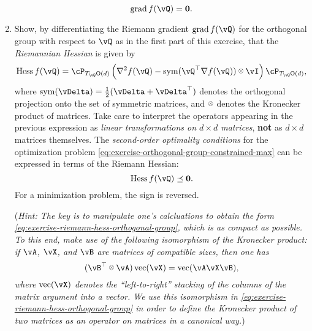 \documentclass[\toplevelprefix/book-main.tex]{subfiles}
\begin{document}
\begin{exercise}
\begin{enumerate}
        \begin{equation*}
            \mathrm{grad}\, f(\vQ) = \mathbf{0}.
        \end{equation*}
        \item Show, by differentiating the Riemann gradient $\mathrm{grad}\, f(\vQ)$ for the orthogonal group with respect to $\vQ$ as in the first part of this exercise, that the \textit{Riemannian Hessian} is given by
        \begin{equation}\label{eq:exercise-riemann-hess-orthogonal-group}
            \mathrm{Hess}\, f(\vQ) = \cP_{T_{\vQ}\O(d)} \left( 
            \nabla^2 f(\vQ) - \Symm(\vQ^\top \nabla f(\vQ)) \kron \vI
            \right) \cP_{T_{\vQ}\O(d)},
        \end{equation}
        where $\Symm(\vDelta) = \tfrac{1}{2}(\vDelta + \vDelta^\top)$ denotes the orthogonal projection onto the set of symmetric matrices, and $\kron$ denotes the Kronecker product of matrices.
        Take care to interpret the operators appearing in the previous expression as \textit{linear transformations on ${d \times d}$ matrices}, \textbf{not} as $d \times d$ matrices themselves.
        The \textit{second-order optimality conditions} for the optimization problem \eqref{eq:exercise-orthogonal-group-constrained-max} can be expressed in terms of the Riemann Hessian:
        \begin{equation*}
            \mathrm{Hess}\, f(\vQ) \preceq \mathbf{0}.
        \end{equation*}
        For a minimization problem, the sign is reversed.

        (\textit{Hint: The key is to manipulate one's calcluations to obtain the form \eqref{eq:exercise-riemann-hess-orthogonal-group}, which is as compact as possible. To this end, make use of the following isomorphism of the Kronecker product: if $\vA$, $\vX$, and $\vB$ are matrices of compatible sizes, then one has
        \begin{equation*}
            (\vB^\top \kron \vA) \Vec(\vX) = \Vec(\vA \vX \vB),
        \end{equation*}
        where $\Vec(\vX)$ denotes the ``left-to-right'' stacking of the columns of the matrix argument into a vector. We use this isomorphism in \eqref{eq:exercise-riemann-hess-orthogonal-group} in order to define the Kronecker product of two matrices as an operator on matrices in a canonical way.})
        

\end{enumerate}
\end{exercise}
\end{document}
